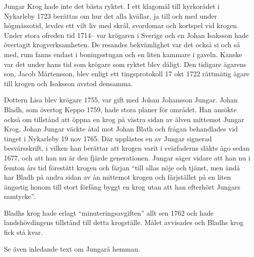 
Jungar Krog hade inte det bästa ryktet. I ett klagomål till kyrkorådet i Nykarleby 1723 berättas om hur det alla kvällar, ja till och med under högmässotid, levdes ett vilt liv med skrål, svordomar och kortspel vid krogen. Under stora ofreden tid 1714-- var krögaren i Sverige och en Johan Isaksson hade övertagit krogverksamheten. De resandes bekvämlighet var det också si och så med, rum fanns endast i boningsstugan och en liten kammare i gaveln. Kanske var det under hans tid som krögare som ryktet blev dåligt. Den tidigare ägarens son, Jacob Mårtensson, blev enligt ett tingsprotokoll 17 okt 1722 rättmätig ägare till krogen och Isaksson avstod densamma.

Dottern Lisa blev krögare 1755, var gift med Johan Johansson Jungar. Johan Bladh, som övertog Keppo 1759, hade stora planer för området. Han ansökte också om tillstånd att öppna en krog på västra sidan av älven mittemot Jungar Krog. Johan Jungar väckte åtal mot Johan Blath och frågan behandlades vid tinget i Nykarleby 19 nov 1765. Där upplästes en av Jungar signerad besvärsskrift, i vilken han berättar att krogen varit i svärfaderns släkts ägo sedan 1677, och att han nu är den fjärde generationen. Jungar säger vidare att han nu i femton års tid förestått krogen och färjan ``till allas nöje och tjänst, men ändå har Bladh på andra sidan av ån mittemot krogen och färjstället på en liten ängsstig honom till stort förfång byggt en krog utan att han efterhört Jungars samtycke''.

Bladhs krog hade erlagt ``minuteringsavgiften'' allt sen 1762 och hade landshövdingens tillstånd till detta krogställe. Målet avvisades och Bladhs krog fick stå kvar.




Se även inledande text om Jungarå hemman.


